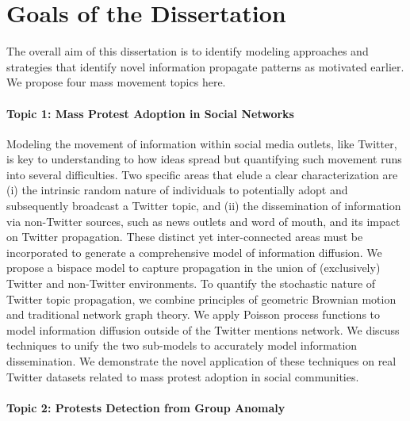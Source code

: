 \section{Goals of the Dissertation}
The overall aim of this dissertation is to identify modeling approaches and strategies that identify
novel information propagate patterns as motivated earlier. We propose
four mass movement topics here.

\paragraph{Topic 1: Mass Protest Adoption in Social Networks}

Modeling the movement of information within social media outlets, like
Twitter, is key to understanding to how ideas spread but quantifying such
movement runs into several difficulties. Two specific areas that elude a clear
characterization are (i) the intrinsic random nature of individuals to
potentially adopt and subsequently broadcast a Twitter topic, and (ii) the
dissemination of information via non-Twitter sources, such as news outlets
and word of mouth, and its impact on Twitter propagation. These distinct
yet inter-connected areas must be incorporated to generate a
comprehensive model of information diffusion. We propose a bispace model
to capture propagation in the union of (exclusively) Twitter and
non-Twitter environments. To quantify the stochastic nature of Twitter
topic propagation, we combine principles of geometric Brownian motion and
traditional network graph theory. We apply Poisson process functions to model
information diffusion outside of the Twitter mentions network. We discuss techniques
to unify the two sub-models to accurately model information dissemination. We
demonstrate the novel application of these techniques on real
Twitter datasets related to mass protest adoption in social communities.

\paragraph{Topic 2: Protests Detection from Group Anomaly}

